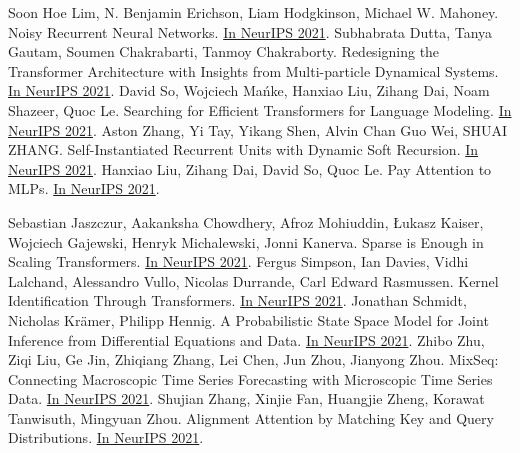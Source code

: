 \documentclass[b5paper,xelatex,ja=standard,10pt]{bxjsarticle}
\begin{document}
\begin{thebibliography}{99}
     Soon Hoe Lim, N. Benjamin Erichson, Liam Hodgkinson, Michael W. Mahoney. Noisy Recurrent Neural Networks. {\href{https://proceedings.neurips.cc/paper/2021/hash/29301521774ff3cbd26652b2d5c95996-Abstract.html}{In NeurIPS 2021}}.
     Subhabrata Dutta, Tanya Gautam, Soumen Chakrabarti, Tanmoy Chakraborty. Redesigning the Transformer Architecture with Insights from Multi-particle Dynamical Systems. {\href{https://proceedings.neurips.cc/paper/2021/hash/2bd388f731f26312bfc0fe30da009595-Abstract.html}{In NeurIPS 2021}}.
     David So, Wojciech Mańke, Hanxiao Liu, Zihang Dai, Noam Shazeer, Quoc Le. Searching for Efficient Transformers for Language Modeling. {\href{https://proceedings.neurips.cc/paper/2021/hash/2f3c6a4cd8af177f6456e7e51a916ff3-Abstract.html}{In NeurIPS 2021}}.
     Aston Zhang, Yi Tay, Yikang Shen, Alvin Chan Guo Wei, SHUAI ZHANG. Self-Instantiated Recurrent Units with Dynamic Soft Recursion. {\href{https://proceedings.neurips.cc/paper/2021/hash/3341f6f048384ec73a7ba2e77d2db48b-Abstract.html}{In NeurIPS 2021}}.
     Hanxiao Liu, Zihang Dai, David So, Quoc Le. Pay Attention to MLPs. {\href{https://proceedings.neurips.cc/paper/2021/hash/4cc05b35c2f937c5bd9e7d41d3686fff-Abstract.html}{In NeurIPS 2021}}.

     Sebastian Jaszczur, Aakanksha Chowdhery, Afroz Mohiuddin, Łukasz Kaiser, Wojciech Gajewski, Henryk Michalewski, Jonni Kanerva. Sparse is Enough in Scaling Transformers. {\href{https://proceedings.neurips.cc/paper/2021/hash/51f15efdd170e6043fa02a74882f0470-Abstract.html}{In NeurIPS 2021}}.
     Fergus Simpson, Ian Davies, Vidhi Lalchand, Alessandro Vullo, Nicolas Durrande, Carl Edward Rasmussen. Kernel Identification Through Transformers. {\href{https://proceedings.neurips.cc/paper/2021/hash/56c3b2c6ea3a83aaeeff35eeb45d700d-Abstract.html}{In NeurIPS 2021}}.
     Jonathan Schmidt, Nicholas Krämer, Philipp Hennig. A Probabilistic State Space Model for Joint Inference from Differential Equations and Data. {\href{https://proceedings.neurips.cc/paper/2021/hash/6734fa703f6633ab896eecbdfad8953a-Abstract.html}{In NeurIPS 2021}}.
     Zhibo Zhu, Ziqi Liu, Ge Jin, Zhiqiang Zhang, Lei Chen, Jun Zhou, Jianyong Zhou. MixSeq: Connecting Macroscopic Time Series Forecasting with Microscopic Time Series Data. {\href{https://proceedings.neurips.cc/paper/2021/hash/6b5754d737784b51ec5075c0dc437bf0-Abstract.html}{In NeurIPS 2021}}.
     Shujian Zhang, Xinjie Fan, Huangjie Zheng, Korawat Tanwisuth, Mingyuan Zhou. Alignment Attention by Matching Key and Query Distributions. {\href{https://proceedings.neurips.cc/paper/2021/hash/6fd6b030c6afec018415662d0db43f9d-Abstract.html}{In NeurIPS 2021}}.


\end{thebibliography}
\end{document}
